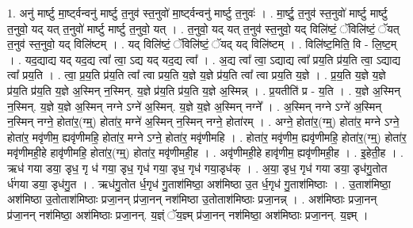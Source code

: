 \documentclass[17pt]{extarticle}
\begin{document}
1. अनु॑ मार्ष्टु मा॒र्ष्ट्वन्वनु॑ मार्ष्टु त॒नुव॑ स्त॒नुवो॑ मा॒र्ष्ट्वन्वनु॑ मार्ष्टु त॒नुवः॑ । . मा॒र्ष्टु॒ त॒नुव॑ स्त॒नुवो॑ मार्ष्टु मार्ष्टु त॒नुवो॒ यद् यत् त॒नुवो॑ मार्ष्टु मार्ष्टु त॒नुवो॒ यत् । . त॒नुवो॒ यद् यत् त॒नुव॑ स्त॒नुवो॒ यद् विलि॑ष्टं॒ ॅविलि॑ष्टं॒ ॅयत् त॒नुव॑ स्त॒नुवो॒ यद् विलि॑ष्टम् । . यद् विलि॑ष्टं॒ ॅविलि॑ष्टं॒ ॅयद् यद् विलि॑ष्टम् । . विलि॑ष्ट॒मिति॒ वि - लि॒ष्ट॒म् । . यद॒द्याद्य यद् यद॒द्य त्वा᳚ त्वा॒ ऽद्य यद् यद॒द्य त्वा᳚ । . अ॒द्य त्वा᳚ त्वा॒ ऽद्याद्य त्वा᳚ प्रय॒ति प्र॑य॒ति त्वा॒ ऽद्याद्य त्वा᳚ प्रय॒ति । . त्वा॒ प्र॒य॒ति प्र॑य॒ति त्वा᳚ त्वा प्रय॒ति य॒ज्ञे य॒ज्ञे प्र॑य॒ति त्वा᳚ त्वा प्रय॒ति य॒ज्ञे । . प्र॒य॒ति य॒ज्ञे य॒ज्ञे प्र॑य॒ति प्र॑य॒ति य॒ज्ञे अ॒स्मिन् न॒स्मिन्. य॒ज्ञे प्र॑य॒ति प्र॑य॒ति य॒ज्ञे अ॒स्मिन्न् । . प्र॒यतीति॑ प्र - य॒ति । . य॒ज्ञे अ॒स्मिन् न॒स्मिन्. य॒ज्ञे य॒ज्ञे अ॒स्मिन् नग्ने ऽग्ने॑ अ॒स्मिन्. य॒ज्ञे य॒ज्ञे अ॒स्मिन् नग्ने᳚ । . अ॒स्मिन् नग्ने ऽग्ने॑ अ॒स्मिन् न॒स्मिन् नग्ने॒ होता॑र॒(ग्म्॒) होता॑र॒ मग्ने॑ अ॒स्मिन् न॒स्मिन् नग्ने॒ होता॑रम् । . अग्ने॒ होता॑र॒(ग्म्॒) होता॑र॒ मग्ने ऽग्ने॒ होता॑र॒ मवृ॑णीम॒ ह्यवृ॑णीमहि॒ होता॑र॒ मग्ने ऽग्ने॒ होता॑र॒ मवृ॑णीमहि । . होता॑र॒ मवृ॑णीम॒ ह्यवृ॑णीमहि॒ होता॑र॒(ग्म्॒) होता॑र॒ मवृ॑णीमही॒हे हावृ॑णीमहि॒ होता॑र॒(ग्म्॒) होता॑र॒ मवृ॑णीमही॒ह । . अवृ॑णीमही॒हे हावृ॑णीम॒ ह्यवृ॑णीमही॒ह । . इ॒हेती॒ह । . ऋध॑ गया डया॒ डृध॒ गृ ध॑ गया॒ डृध॒ गृध॑ गया॒ डृध॒ गृध॑ गया॒डृध॑क् । . अ॒या॒ डृध॒ गृध॑ गया डया॒ डृध॑गु॒तोत र्ध॑गया डया॒ डृध॑गु॒त । . ऋध॑गु॒तोत र्ध॒गृध॑ गु॒ताश॑मिष्ठा॒ अश॑मिष्ठा उ॒त र्ध॒गृध॑ गु॒ताश॑मिष्ठाः । . उ॒ताश॑मिष्ठा॒ अश॑मिष्ठा उ॒तोताश॑मिष्ठाः प्रजा॒नन् प्र॑जा॒नन् नश॑मिष्ठा उ॒तोताश॑मिष्ठाः प्रजा॒नन्न् । . अश॑मिष्ठाः प्रजा॒नन् प्र॑जा॒नन् नश॑मिष्ठा॒ अश॑मिष्ठाः प्रजा॒नन्. य॒ज्ञ्ं ॅय॒ज्ञ्म् प्र॑जा॒नन् नश॑मिष्ठा॒ अश॑मिष्ठाः प्रजा॒नन्. य॒ज्ञ्म् । \newline
\end{document}
